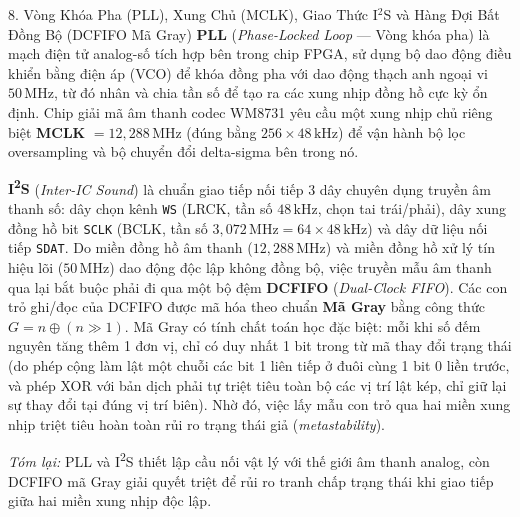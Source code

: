 \begin{feynmanbox}{8. Vòng Khóa Pha (PLL), Xung Chủ (MCLK), Giao Thức I$^2$S và Hàng Đợi Bất Đồng Bộ (DCFIFO Mã Gray)}
\textbf{PLL} (\emph{Phase-Locked Loop} --- Vòng khóa pha) là mạch điện tử analog-số tích hợp bên trong chip FPGA, sử dụng bộ dao động điều khiển bằng điện áp (VCO) để khóa đồng pha với dao động thạch anh ngoại vi $50\,\text{MHz}$, từ đó nhân và chia tần số để tạo ra các xung nhịp đồng hồ cực kỳ ổn định. Chip giải mã âm thanh codec WM8731 yêu cầu một xung nhịp chủ riêng biệt \textbf{MCLK} $= 12{,}288\,\text{MHz}$ (đúng bằng $256 \times 48\,\text{kHz}$) để vận hành bộ lọc oversampling và bộ chuyển đổi delta-sigma bên trong nó.

\textbf{I\textsuperscript{2}S} (\emph{Inter-IC Sound}) là chuẩn giao tiếp nối tiếp 3 dây chuyên dụng truyền âm thanh số: dây chọn kênh \texttt{WS} (LRCK, tần số $48\,\text{kHz}$, chọn tai trái/phải), dây xung đồng hồ bit \texttt{SCLK} (BCLK, tần số $3{,}072\,\text{MHz} = 64 \times 48\,\text{kHz}$) và dây dữ liệu nối tiếp \texttt{SDAT}. Do miền đồng hồ âm thanh ($12{,}288\,\text{MHz}$) và miền đồng hồ xử lý tín hiệu lõi ($50\,\text{MHz}$) dao động độc lập không đồng bộ, việc truyền mẫu âm thanh qua lại bắt buộc phải đi qua một bộ đệm \textbf{DCFIFO} (\emph{Dual-Clock FIFO}). Các con trỏ ghi/đọc của DCFIFO được mã hóa theo chuẩn \textbf{Mã Gray} bằng công thức $G = n \oplus (n \gg 1)$. Mã Gray có tính chất toán học đặc biệt: mỗi khi số đếm nguyên tăng thêm 1 đơn vị, chỉ có duy nhất 1 bit trong từ mã thay đổi trạng thái (do phép cộng làm lật một chuỗi các bit 1 liên tiếp ở đuôi cùng 1 bit 0 liền trước, và phép XOR với bản dịch phải tự triệt tiêu toàn bộ các vị trí lật kép, chỉ giữ lại sự thay đổi tại đúng vị trí biên). Nhờ đó, việc lấy mẫu con trỏ qua hai miền xung nhịp triệt tiêu hoàn toàn rủi ro trạng thái giả (\emph{metastability}).

\emph{Tóm lại:} PLL và I\textsuperscript{2}S thiết lập cầu nối vật lý với thế giới âm thanh analog, còn DCFIFO mã Gray giải quyết triệt để rủi ro tranh chấp trạng thái khi giao tiếp giữa hai miền xung nhịp độc lập.
\end{feynmanbox}

